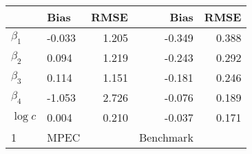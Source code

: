 
\begin{tabular}[t]{llrrr}
\toprule
  & Bias & RMSE & Bias & RMSE\\
\midrule
$\beta_{1}$ & -0.033 & 1.205 & -0.349 & 0.388\\
$\beta_{2}$ & 0.094 & 1.219 & -0.243 & 0.292\\
$\beta_{3}$ & 0.114 & 1.151 & -0.181 & 0.246\\
$\beta_{4}$ & -1.053 & 2.726 & -0.076 & 0.189\\
$\log c$ & 0.004 & 0.210 & -0.037 & 0.171\\
1 & MPEC &  & Benchmark & \\
\bottomrule
\end{tabular}

